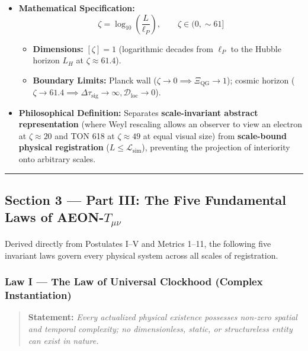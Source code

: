 \documentclass[
]{article}
\providecommand{\tightlist}{%
  \setlength{\itemsep}{0pt}\setlength{\parskip}{0pt}}
\begin{document}
\begin{itemize}
\tightlist
\item
  \textbf{Mathematical Specification:}
  \[\zeta = \log_{10}\!\left(\frac{L}{\ell_P}\right), \qquad \zeta \in (0, \sim 61]\]

  \begin{itemize}
  \tightlist
  \item
    \textbf{Dimensions:} \([\zeta] = 1\) (logarithmic decades from
    \(\ell_P\) to the Hubble horizon \(L_H\) at \(\zeta \approx 61.4\)).
  \item
    \textbf{Boundary Limits:} Planck wall
    (\(\zeta \to 0 \implies \Xi_{\mathrm{QG}} \to 1\)); cosmic horizon
    (\(\zeta \to 61.4 \implies \Delta\tau_{\mathrm{sig}} \to \infty, \mathcal{D}_{\mathrm{loc}} \to 0\)).
  \end{itemize}
\item
  \textbf{Philosophical Definition:} Separates \textbf{scale-invariant
  abstract representation} (where Weyl rescaling allows an observer to
  view an electron at \(\zeta \approx 20\) and TON 618 at
  \(\zeta \approx 49\) at equal visual size) from \textbf{scale-bound
  physical registration} (\(L \le \mathcal{L}_{\mathrm{sim}}\)),
  preventing the projection of interiority onto arbitrary scales.
\end{itemize}

\begin{center}\rule{0.5\linewidth}{0.5pt}\end{center}

\subsection{\texorpdfstring{Section 3 --- Part III: The Five Fundamental
Laws of
AEON-\(T_{\mu\nu}\)}{Section 3 --- Part III: The Five Fundamental Laws of AEON-T\_\{\textbackslash mu\textbackslash nu\}}}\label{section-3-part-iii-the-five-fundamental-laws-of-aeon-t_munu}

Derived directly from Postulates I--V and Metrics 1--11, the following
five invariant laws govern every physical system across all scales of
registration.

\subsubsection{Law I --- The Law of Universal Clockhood (Complex
Instantiation)}\label{law-i-the-law-of-universal-clockhood-complex-instantiation}

\begin{quote}
\textbf{Statement:} \emph{Every actualized physical existence possesses
non-zero spatial and temporal complexity; no dimensionless, static, or
structureless entity can exist in nature.}
\end{quote}
\end{document}
